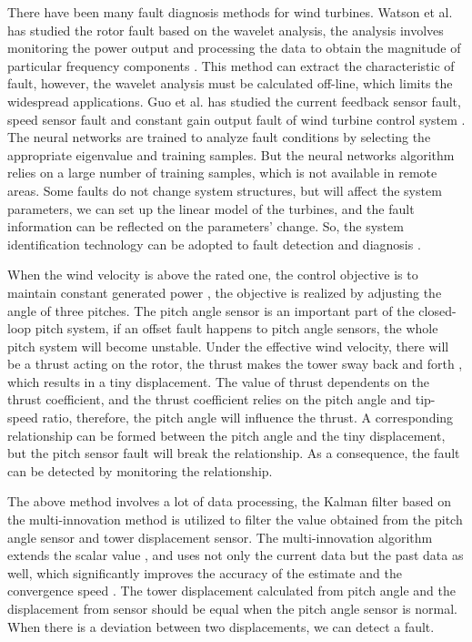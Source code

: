 There have been many fault diagnosis methods for wind turbines.
Watson et al. has studied the rotor fault based on the wavelet analysis,
the analysis involves monitoring the power output and processing the data to
obtain the magnitude of particular frequency components \cite{ref:4}. This method
can extract the characteristic of fault, however, the wavelet analysis
must be calculated off-line, which limits the widespread applications.
Guo et al. has studied the current feedback sensor fault, speed sensor
fault and constant gain output fault of wind turbine control system \cite{ref:5}.
The neural networks are trained to analyze fault conditions by selecting
the appropriate eigenvalue and training samples. But the neural networks
algorithm relies on a large number of training samples, which is not
available in remote areas. Some faults do not
change system structures, but will affect the system parameters, we can
set up the linear model of the turbines, and the fault information can be
reflected on the parameters' change. So, the system identification
technology can be adopted to fault detection and diagnosis \cite{ref:6,DF2014_ND_WangC,DF2015_ND_JiY}.




When the wind velocity is above the rated one, the control objective
is to maintain constant generated power \cite{ref:7}, the objective is realized by
adjusting the angle of three pitches. The pitch angle sensor is an
important part of the closed-loop pitch system, if an offset fault
happens to pitch angle sensors, the whole pitch system will become
unstable. Under the effective wind velocity, there will be a thrust
acting on the rotor, the thrust makes the tower sway back and forth \cite{ref:8},
which results in a tiny displacement. The value of thrust dependents
on the thrust coefficient, and the thrust coefficient relies on the pitch
angle and tip-speed ratio, therefore, the pitch angle will influence
the thrust. A corresponding relationship can be formed between the
pitch angle and the tiny displacement, but the pitch sensor fault
will break the relationship. As a consequence, the fault can be
detected by monitoring the relationship.

The above method involves a lot of data processing, the
Kalman filter based on the multi-innovation method is utilized to filter the
value obtained from the pitch angle sensor and tower displacement
sensor. The multi-innovation algorithm extends the scalar value \cite{ref:9,ref:10,ref:11},
and uses not only the current data but
the past data as well, which significantly improves the accuracy of the
estimate and the convergence speed \cite{ref:12}. The tower displacement
calculated from pitch angle and the displacement from sensor should
 be equal when the pitch angle sensor is normal. When there is a
 deviation between two displacements, we can detect a fault.

